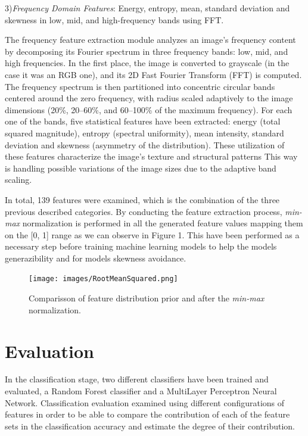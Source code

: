 \documentclass[11pt,a4paper]{article}
\begin{document}
	3)\textit{Frequency Domain Features}: Energy, entropy, mean, standard deviation and skewness in low, mid, and high-frequency 
	bands using FFT.
	
	The frequency feature extraction module analyzes an image's frequency content 
	by decomposing its Fourier spectrum in three frequency bands: low, mid, and high frequencies. 
	In the first place, the image is converted to grayscale (in the case it was an RGB one), 
	and its 2D Fast Fourier Transform (FFT) is computed. 
	The frequency spectrum is then partitioned into concentric circular bands 
	centered around the zero frequency, with radius scaled adaptively to the image 
	dimensions (20\%, 20–60\%, and 60–100\% of the maximum frequency). 
	For each one of the bands, five statistical features have been extracted:
	energy (total squared magnitude), entropy (spectral uniformity), mean intensity, standard deviation
	and skewness (asymmetry of the distribution). 
	These utilization of these features characterize the image's texture and structural patterns 
	This way is handling possible variations of the image sizes due to the adaptive band scaling.
	
	In total, 139 features were examined, which is the combination of the three previous described categories.
	By conducting the feature extraction process, \textit{min-max} normalization is performed in all the generated feature values
	mapping them on the [0, 1] range as we can observe in Figure 1. This have been performed as a necessary step
	before training machine learning models to help the models generazibility and for models skewness avoidance.

		\begin{figure}[h]
			\centering
			\texttt{[image: images/RootMeanSquared.png]}
			\caption{Comparisson of feature distribution prior and after the \textit{min-max} normalization.}
			\label{fig1:}
		\end{figure}		



    \section{Evaluation}
		
		\par In the classification stage, two different classifiers have been trained and evaluated, a Random Forest classifier
		and a MultiLayer Perceptron Neural Network. Classification evaluation examined using different configurations of features
		in order to be able to compare the contribution of each of the feature sets in the classification accuracy and estimate
		the degree of their contribution.
\end{document}
